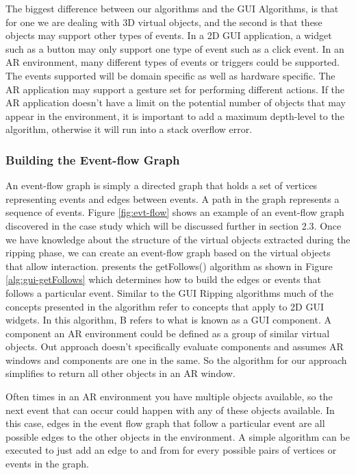 \documentclass[final,3p]{CSP}
\begin{document}
The biggest difference between our algorithms and the GUI Algorithms, is that for one we are dealing with 3D virtual objects, and the second is that these objects may support other types of events.  In a 2D GUI application, a widget such as a button may only support one type of event such as a click event.  In an AR environment, many different types of events or triggers could be supported.  The events supported will be domain specific as well as hardware specific.  The AR application may support a gesture set for performing different actions.  If the AR application doesn't have a limit on the potential number of objects that may appear in the environment, it is important to add a maximum depth-level to the algorithm, otherwise it will run into a stack overflow error.

\subsubsection{Building the Event-flow Graph}
\noindent
An event-flow graph is simply a directed graph that holds a set of vertices representing events and edges between events.  A path in the graph represents a sequence of events.  Figure \ref{fig:evt-flow} shows an example of an event-flow graph discovered in the case study which will be discussed further in section 2.3. Once we have knowledge about the structure of the virtual objects extracted during the ripping phase, we can create an event-flow graph based on the virtual objects that allow interaction. \cite{EventFlow} presents the getFollows() algorithm as shown in Figure \ref{alg:gui-getFollows} which determines how to build the edges or events that follows a particular event.  Similar to the GUI Ripping algorithms much of the concepts presented in the algorithm refer to concepts that apply to 2D GUI widgets.  In this algorithm, B refers to what is known as a GUI component.  A component an AR environment could be defined as a group of similar virtual objects.  Out approach doesn't specifically evaluate components and assumes AR windows and components are one in the same.  So the algorithm for our approach simplifies to return all other objects in an AR window.

Often times in an AR environment you have multiple objects available, so the next event that can occur could happen with any of these objects available.  In this case, edges in the event flow graph that follow a particular event are all possible edges to the other objects in the environment.  A simple algorithm can be executed to just add an edge to and from for every possible pairs of vertices or events in the graph.
\end{document}

